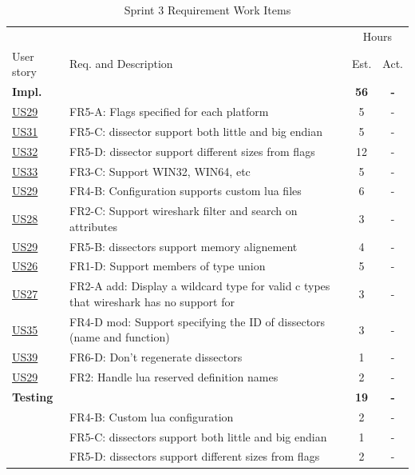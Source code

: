 \begin{table}[!htb] \small \center
\caption{Sprint 3 Requirement Work Items \label{tab:sprint3req}}
\begin{tabularx}{\textwidth}{l X c c}
	\toprule
	& & \multicolumn{2}{c}{Hours} \\
	\cmidrule(r){3-4}
	User story & Req. and Description & Est. & Act. \\
	\midrule
	\textbf{Impl.} &  & \textbf{56} & \textbf{-} \\
	\hyperref[tab:req:stories7]{US29} & FR5-A: Flags specified for each platform &  5  & - \\
	\hyperref[tab:req:stories8]{US31} & FR5-C: \Gls{dissector} support both little and big \gls{endian} & 5  & - \\
	\hyperref[tab:req:stories8]{US32} & FR5-D: \Gls{dissector} support different sizes from flags & 12  & - \\
	\hyperref[tab:req:stories8]{US33} & FR3-C: Support WIN32, WIN64,\GLS{sparc} etc &  5  & - \\
	\hyperref[tab:req:stories7]{US29} & FR4-B: Configuration supports custom \Gls{lua} files & 6 & -\\
	\hyperref[tab:req:stories7]{US28} & FR2-C: Support \Gls{wireshark} filter and search on attributes &  3 & -\\
	\hyperref[tab:req:stories7]{US29} & FR5-B: \Glspl{dissector} support memory alignement & 4 & -\\
	\hyperref[tab:req:stories7]{US26} & FR1-D: Support members of type \gls{union} & 5  & -\\
	\hyperref[tab:req:stories7]{US27} & FR2-A add: Display a wildcard type for valid c types that \Gls{wireshark} has no support for & 3  & - \\
	\hyperref[tab:req:stories9]{US35} & FR4-D mod: Support specifying the ID of \glspl{dissector} (name and function) & 3  & - \\
	\hyperref[tab:req:stories9]{US39} & FR6-D: Don’t regenerate \glspl{dissector} & 1 & - \\
	\hyperref[tab:req:stories7]{US29} & FR2: Handle \Gls{lua} reserved definition names & 2 & - \\
	\addlinespace
	\textbf{Testing} &  & \textbf{19} & \textbf{-} \\
	 & FR4-B: Custom \Gls{lua} configuration & 2 & - \\
	 & FR5-C: \Glspl{dissector} support both little and big \gls{endian} & 1 & - \\
	 & FR5-D: \Glspl{dissector} support different sizes from flags & 2 & - \\

\end{tabularx}
\end{table}
